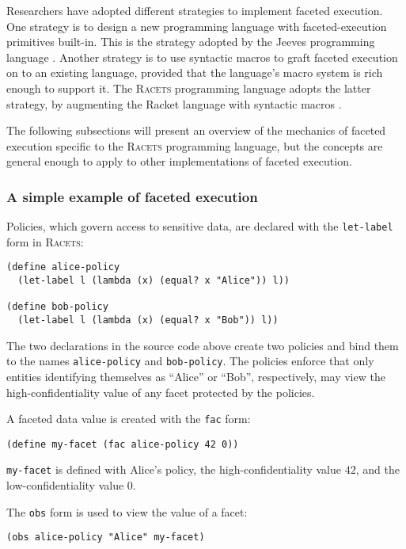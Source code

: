 \documentclass{article}
\begin{document}
Researchers have adopted different strategies to implement faceted execution. One strategy is to design a new programming language with faceted-execution primitives built-in. This is the strategy adopted by the Jeeves programming language \cite{jeeves}. Another strategy is to use syntactic macros to graft faceted execution on to an existing language, provided that the language's macro system is rich enough to support it. The \textsc{Racets} programming language adopts the latter strategy, by augmenting the Racket language with syntactic macros \cite{racets}.

The following subsections will present an overview of the mechanics of faceted execution specific to the \textsc{Racets} programming language, but the concepts are general enough to apply to other implementations of faceted execution.

\subsubsection{A simple example of faceted execution}
Policies, which govern access to sensitive data, are declared with the \texttt{let-label} form in \textsc{Racets}:

\begin{lstlisting}
(define alice-policy
  (let-label l (lambda (x) (equal? x "Alice")) l))

(define bob-policy
  (let-label l (lambda (x) (equal? x "Bob")) l))
\end{lstlisting}

The two declarations in the source code above create two policies and bind them to the names \texttt{alice-policy} and \texttt{bob-policy}. The policies enforce that only entities identifying themselves as ``Alice'' or ``Bob'', respectively, may view the high-confidentiality value of any facet protected by the policies.

A faceted data value is created with the \texttt{fac} form:

\begin{lstlisting}
(define my-facet (fac alice-policy 42 0))
\end{lstlisting}

\texttt{my-facet} is defined with Alice's policy, the high-confidentiality value $42$, and the low-confidentiality value $0$.

The \texttt{obs} form is used to view the value of a facet:

\begin{lstlisting}
(obs alice-policy "Alice" my-facet)
\end{lstlisting}
\end{document}
